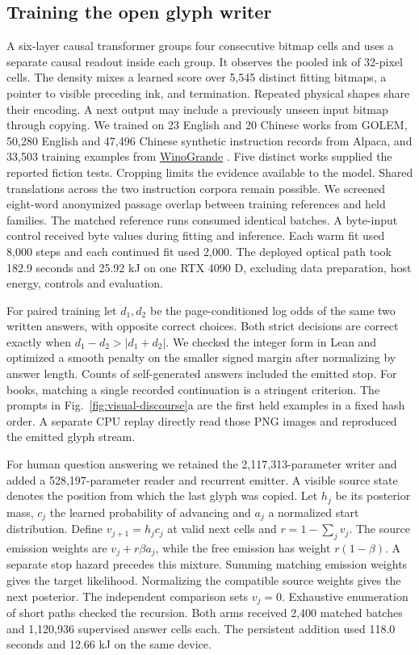 \documentclass[12pt,a4paper]{article}
\providecommand{\DIFadd}[1]{{\protect\color{blue} \sf #1}} %
\begin{document}
\subsection*{\DIFadd{Training the open glyph writer}}
\DIFadd{A six-layer causal transformer groups four consecutive bitmap cells and uses a separate causal readout inside each group. It observes the pooled ink of 32-pixel cells. The density mixes a learned score over 5,545 distinct fitting bitmaps, a pointer to visible preceding ink, and termination. Repeated physical shapes share their encoding. A next output may include a previously unseen input bitmap through copying. We trained on 23 English and 20 Chinese works from GOLEM, 50,280 English and 47,496 Chinese synthetic instruction records from Alpaca, and 33,503 training examples from }\href{https://winogrande.allenai.org/}{\DIFadd{WinoGrande}}\DIFadd{. Five distinct works supplied the reported fiction tests. Cropping limits the evidence available to the model. Shared translations across the two instruction corpora remain possible. We screened eight-word anonymized passage overlap between training references and held families. The matched reference runs consumed identical batches. A byte-input control received byte values during fitting and inference. Each warm fit used 8,000 steps and each continued fit used 2,000. The deployed optical path took 182.9 seconds and 25.92 kJ on one RTX 4090 D, excluding data preparation, host energy, controls and evaluation.
}

\DIFadd{For paired training let $d_1,d_2$ be the page-conditioned log odds of the same two written answers, with opposite correct choices. Both strict decisions are correct exactly when $d_1-d_2>|d_1+d_2|$. We checked the integer form in Lean and optimized a smooth penalty on the smaller signed margin after normalizing by answer length. Counts of self-generated answers included the emitted stop. For books, matching a single recorded continuation is a stringent criterion. The prompts in Fig.~\ref{fig:visual-discourse}a are the first held examples in a fixed hash order. A separate CPU replay directly read those PNG images and reproduced the emitted glyph stream.
}

\DIFadd{For human question answering we retained the 2,117,313-parameter writer and added a 528,197-parameter reader and recurrent emitter. A visible source state denotes the position from which the last glyph was copied. Let $h_j$ be its posterior mass, $c_j$ the learned probability of advancing and $a_j$ a normalized start distribution. Define $v_{j+1}=h_j c_j$ at valid next cells and $r=1-\sum_j v_j$. The source emission weights are $v_j+r\beta a_j$, while the free emission has weight $r(1-\beta)$. A separate stop hazard precedes this mixture. Summing matching emission weights gives the target likelihood. Normalizing the compatible source weights gives the next posterior. The independent comparison sets $v_j=0$. Exhaustive enumeration of short paths checked the recursion. Both arms received 2,400 matched batches and 1,120,936 supervised answer cells each. The persistent addition used 118.0 seconds and 12.66 kJ on the same device.
}
\end{document}
